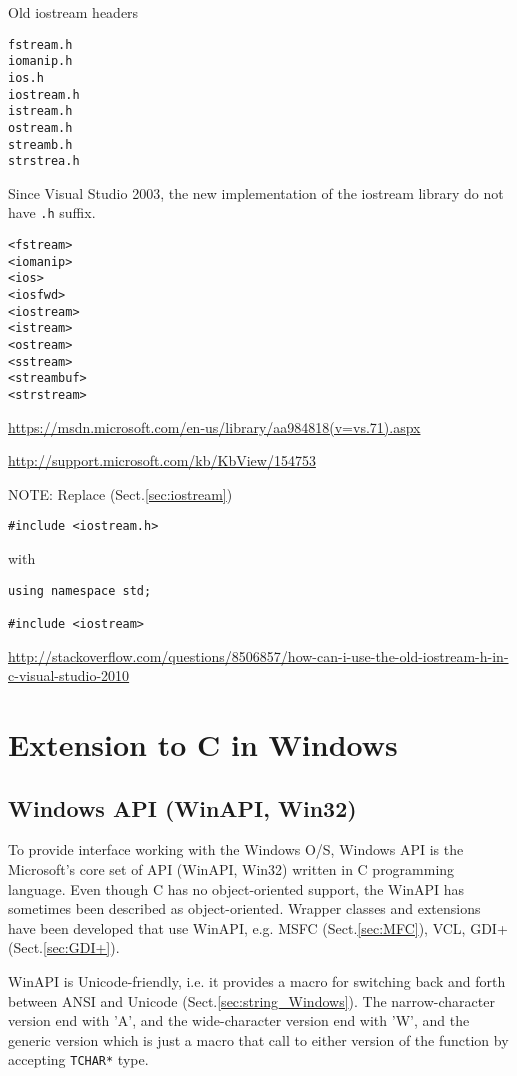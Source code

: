 Old iostream headers
\begin{verbatim}
fstream.h
iomanip.h
ios.h
iostream.h
istream.h
ostream.h
streamb.h
strstrea.h
\end{verbatim}

Since Visual Studio 2003, the new implementation of the iostream library do not have \verb!.h! suffix.
\begin{verbatim}
<fstream>
<iomanip>
<ios>
<iosfwd>
<iostream>
<istream>
<ostream>
<sstream>
<streambuf>
<strstream>
\end{verbatim}
\url{https://msdn.microsoft.com/en-us/library/aa984818(v=vs.71).aspx}


\url{http://support.microsoft.com/kb/KbView/154753}


NOTE: Replace (Sect.\ref{sec:iostream})
\begin{verbatim}
#include <iostream.h>
\end{verbatim}

with
\begin{verbatim}
using namespace std;

#include <iostream>
\end{verbatim}
\url{http://stackoverflow.com/questions/8506857/how-can-i-use-the-old-iostream-h-in-c-visual-studio-2010}


\section{Extension to C in Windows}
\label{sec:C_Windows}

\subsection{Windows API (WinAPI, Win32)}
\label{sec:WinAPI}

To provide interface working with the Windows O/S, Windows API is the
Microsoft's core set of API (WinAPI, Win32) written in C programming language.
Even though C has no object-oriented support, the WinAPI has sometimes been
described as object-oriented. Wrapper classes and extensions have been
developed that use WinAPI, e.g. MSFC (Sect.\ref{sec:MFC}), VCL, GDI+
(Sect.\ref{sec:GDI+}).

WinAPI is Unicode-friendly, i.e. it provides a macro for switching back and
forth between ANSI and Unicode (Sect.\ref{sec:string_Windows}). The
narrow-character version end with 'A', and the wide-character version end with
'W', and the generic version which is just a macro that call to either version
of the function by accepting \verb!TCHAR*! type.

